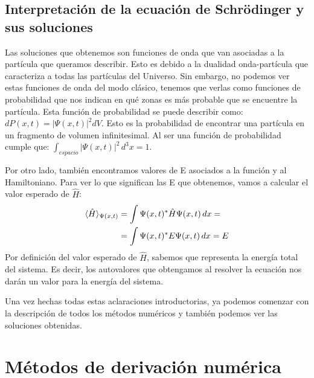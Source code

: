 \documentclass[12pt]{article}
\begin{document}
\subsection{Interpretación de la ecuación de Schrödinger y sus soluciones}
Las soluciones que obtenemos son
funciones de onda que van asociadas a la partícula que queramos 
describir. Esto es debido a la dualidad onda-partícula que caracteriza
a todas las partículas del Universo. Sin embargo, no podemos ver
estas funciones de onda del modo clásico, tenemos que verlas como
funciones de probabilidad que nos indican en qué zonas es más probable que se encuentre la partícula. Esta función de probabilidad
se puede describir como: $dP(x,t)=\left\lvert \Psi (x,t) \right\rvert^{2} dV$.
Esto es la probabilidad de encontrar una partícula en un fragmento
de volumen infinitesimal. Al ser una función de probabilidad cumple que:
$\int_{espacio} \left\lvert \Psi (x,t) \right\rvert^{2} \,d^{3}x=1$. \\
\par
Por otro lado, también encontramos valores de E asociados a la función y al Hamiltoniano. Para ver lo que significan las E que obtenemos, vamos a calcular el valor esperado de $\hat{H}$:
\begin{align}
\langle \hat{H} \rangle_{\Psi (x,t)} \notag 
&=\int \Psi (x,t)^{*} \hat{H} \Psi (x,t) \,dx= \notag \\
&=\int \Psi (x,t)^{*} E \Psi (x,t) \,dx= E
\end{align}
Por definición del valor esperado de $\hat{H}$, sabemos que representa
la  energía total del sistema. Es decir, los autovalores que obtengamos
al resolver la ecuación nos darán un valor para la energía
del sistema. \\
\par
Una vez hechas todas estas aclaraciones introductorias, ya podemos
comenzar con la descripción de todos los métodos numéricos y 
también podemos ver las soluciones obtenidas.

\newpage
\section{Métodos de derivación numérica}
\end{document}
